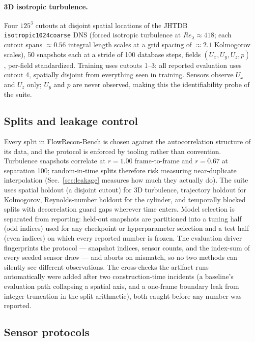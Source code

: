 \documentclass[aip,pof,reprint,amsmath,amssymb,superscriptaddress]{revtex4-1}
\newcommand{\benchname}{FlowRecon-Bench}
\begin{document}
\paragraph{3D isotropic turbulence.} Four $125^3$ cutouts at disjoint spatial
locations of the JHTDB \texttt{isotropic1024coarse} DNS\cite{li2008public}
(forced isotropic turbulence at $Re_\lambda\approx418$; each cutout spans
${\approx}0.56$ integral length scales at a grid spacing of ${\approx}2.1$
Kolmogorov scales), 50 snapshots each at a stride of 100 database steps,
fields $(U_x,U_y,U_z,p)$, per-field standardized. Training uses cutouts 1--3; all
reported evaluation uses cutout 4, spatially disjoint from everything seen in
training. Sensors observe $U_x$ and $U_z$ only; $U_y$ and $p$ are never
observed, making this the identifiability probe of the suite.

\subsection{Splits and leakage control}\label{sec:splits}

Every split in \benchname{} is chosen against the autocorrelation structure of
its data, and the protocol is enforced by tooling rather than convention.
Turbulence snapshots correlate at $r=1.00$ frame-to-frame and $r=0.67$ at
separation 100; random-in-time splits therefore risk measuring near-duplicate
interpolation (Sec.~\ref{sec:leakage} measures how much they actually do). The suite
uses spatial holdout (a disjoint cutout) for 3D turbulence, trajectory holdout
for Kolmogorov, Reynolds-number holdout for the cylinder, and temporally
blocked splits with decorrelation guard gaps wherever time enters. Model selection is separated from reporting: held-out snapshots
are partitioned into a tuning half (odd indices) used for any checkpoint or
hyperparameter selection and a test half (even indices) on which every
reported number is frozen. The evaluation driver fingerprints the protocol ---
snapshot indices, sensor counts, and the index-sum of every seeded sensor draw
--- and aborts on mismatch, so no two methods can silently see different
observations. The cross-checks the artifact runs automatically were added
after two construction-time incidents (a baseline's evaluation path collapsing
a spatial axis, and a one-frame boundary leak from integer truncation in the
split arithmetic), both caught before any number was reported.

\subsection{Sensor protocols}\label{sec:sensors}
\end{document}
